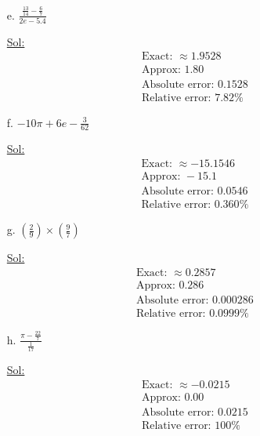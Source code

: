 \begin{enumerate}
\begin{itemize}
    \item[e.] \( \frac{\frac{13}{14} - \frac{6}{7}}{2e - 5.4} \)

      \underline{Sol:}\\
      \[
        \begin{array}{l}
          \textrm{Exact: } \approx 1.9528 \\
          \textrm{Approx: } 1.80 \\
          \textrm{Absolute error: } 0.1528 \\
          \textrm{Relative error: } 7.82\%
        \end{array}
      \]
      \bigbreak

    \item[f.] \( -10\pi + 6e - \frac{3}{62} \)

      \underline{Sol:}\\
      \[
        \begin{array}{l}
          \textrm{Exact: } \approx -15.1546 \\
          \textrm{Approx: } -15.1 \\
          \textrm{Absolute error: } 0.0546 \\
          \textrm{Relative error: } 0.360\%
        \end{array}
      \]
      \bigbreak

    \item[g.] \( \left( \frac{2}{9} \right) \times \left( \frac{9}{7} \right) \)

      \underline{Sol:}\\
      \[
        \begin{array}{l}
          \textrm{Exact: } \approx 0.2857 \\
          \textrm{Approx: } 0.286 \\
          \textrm{Absolute error: } 0.000286 \\
          \textrm{Relative error: } 0.0999\%
        \end{array}
      \]
      \bigbreak

    \item[h.] \( \frac{\pi - \frac{22}{7}}{\frac{1}{17}} \)

      \underline{Sol:}\\
      \[
        \begin{array}{l}
          \textrm{Exact: } \approx -0.0215 \\
          \textrm{Approx: } 0.00 \\
          \textrm{Absolute error: } 0.0215 \\
          \textrm{Relative error: } 100\%
        \end{array}
      \]
      \bigbreak
  \end{itemize}


\end{enumerate}
